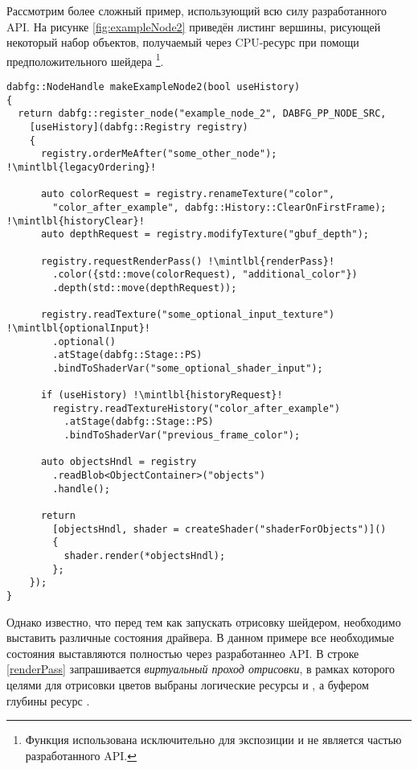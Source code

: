 Рассмотрим более сложный пример, использующий всю силу разработанного API.
На рисунке \ref{fig:exampleNode2} приведён листинг вершины, рисующей некоторый набор объектов, получаемый через CPU-ресурс  при помощи предположительного шейдера \footnote{Функция  использована исключительно для экспозиции и не является частью разработанного API.}.
\begin{figure*}
\begin{verbatim}
dabfg::NodeHandle makeExampleNode2(bool useHistory)
{
  return dabfg::register_node("example_node_2", DABFG_PP_NODE_SRC,
    [useHistory](dabfg::Registry registry)
    {
      registry.orderMeAfter("some_other_node"); !\mintlbl{legacyOrdering}!

      auto colorRequest = registry.renameTexture("color",
        "color_after_example", dabfg::History::ClearOnFirstFrame); !\mintlbl{historyClear}!
      auto depthRequest = registry.modifyTexture("gbuf_depth");

      registry.requestRenderPass() !\mintlbl{renderPass}!
        .color({std::move(colorRequest), "additional_color"})
        .depth(std::move(depthRequest));

      registry.readTexture("some_optional_input_texture") !\mintlbl{optionalInput}!
        .optional()
        .atStage(dabfg::Stage::PS)
        .bindToShaderVar("some_optional_shader_input");

      if (useHistory) !\mintlbl{historyRequest}!
        registry.readTextureHistory("color_after_example")
          .atStage(dabfg::Stage::PS)
          .bindToShaderVar("previous_frame_color");

      auto objectsHndl = registry
        .readBlob<ObjectContainer>("objects")
        .handle();

      return
        [objectsHndl, shader = createShader("shaderForObjects")]()
        {
          shader.render(*objectsHndl);
        };
    });
}
\end{verbatim}
\caption{Листинг усложнённого примера использования разработанного API.}
\label{fig:exampleNode2}
\end{figure*}
Однако известно, что перед тем как запускать отрисовку шейдером, необходимо выставить различные состояния драйвера.
В данном примере все необходимые состояния выставляются полностью через разработаннео API.
В строке \ref{renderPass} запрашивается \textit{виртуальный проход отрисовки}, в рамках которого целями для отрисовки цветов выбраны логические ресурсы  и , а буфером глубины ресурс .

